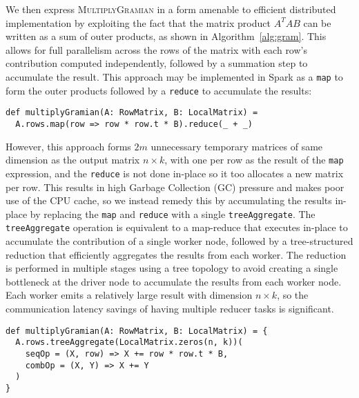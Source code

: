 We then express \textsc{MultiplyGramian} in a form amenable to efficient distributed implementation
by exploiting the fact that the matrix product $A^TAB$ can be written as a sum of outer products,
as shown in Algorithm~\ref{alg:gram}. This allows for full parallelism across the rows of the matrix with
each row's contribution computed independently, followed by a summation step to accumulate the result.
This approach may be implemented in Spark as a \texttt{map} to form the outer products followed by a \texttt{reduce}
to accumulate the results:
\begin{verbatim}
def multiplyGramian(A: RowMatrix, B: LocalMatrix) =
  A.rows.map(row => row * row.t * B).reduce(_ + _)
\end{verbatim}
However, this approach forms $2m$ unnecessary temporary matrices of same dimension as the output matrix $n\times k$,
with one per row as the result of the \texttt{map} expression, and the \texttt{reduce} is not done in-place so it
too allocates a new matrix per row.
This results in high Garbage Collection (GC) pressure and makes poor use of the CPU cache, so
we instead remedy this by accumulating the results in-place by replacing the \texttt{map}
and \texttt{reduce} with a single \texttt{treeAggregate}.
The \texttt{treeAggregate} operation is equivalent to a map-reduce that executes in-place to accumulate the contribution of a
single worker node, followed by a
tree-structured reduction that efficiently aggregates the results from each worker.
The reduction is performed in multiple stages using a tree topology to avoid creating a single
bottleneck at the driver node to accumulate the results from each worker node.
Each worker emits a relatively large result with dimension $n\times k$, so the
communication latency savings of having multiple reducer tasks is significant.
\begin{verbatim}
def multiplyGramian(A: RowMatrix, B: LocalMatrix) = {
  A.rows.treeAggregate(LocalMatrix.zeros(n, k))(
    seqOp = (X, row) => X += row * row.t * B,
    combOp = (X, Y) => X += Y
  )
}
\end{verbatim}


